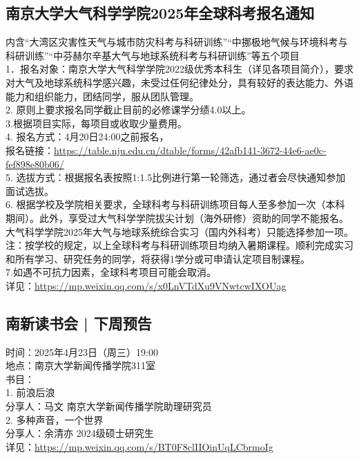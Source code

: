 \documentclass[letterpaper, 12pt]{article}
\begin{document}
\begin{multicols}{2}
\subsection{南京大学大气科学学院2025年全球科考报名通知} %
内含“大湾区灾害性天气与城市防灾科考与科研训练”“中挪极地气候与环境科考与科研训练”“中芬赫尔辛基大气与地球系统科考与科研训练”等五个项目
\\1．报名对象：南京大学大气科学学院2022级优秀本科生（详见各项目简介），要求对大气及地球系统科学感兴趣，未受过任何纪律处分，具有较好的表达能力、外语能力和组织能力，团结同学，服从团队管理。
\\2. 原则上要求报名同学截止目前的必修课学分绩4.0以上。
\\3.根据项目实际，每项目或收取少量费用。
\\4. 报名方式：4月20日24:00之前报名，
\\报名链接：\url{https://table.nju.edu.cn/dtable/forms/42afb141-3672-44e6-ae0c-fef898e80b06/}
\\5.  选拔方式：根据报名表按照1:1.5比例进行第一轮筛选，通过者会尽快通知参加面试选拔。
\\6. 根据学校及学院相关要求，全球科考与科研训练项目每人至多参加一次（本科期间）。此外，享受过大气科学学院拔尖计划（海外研修）资助的同学不能报名。大气科学学院2025年大气与地球系统综合实习（国内外科考）只能选择参加一项。
\\注：按学校的规定，以上全球科考与科研训练项目均纳入暑期课程。顺利完成实习和所有学习、研究任务的同学，将获得1学分或可申请认定项目制课程。
\\7.如遇不可抗力因素，全球科考项目可能会取消。
\\详见：\url{https://mp.weixin.qq.com/s/x0LnVTdXu9VNwtcwIXOUag}

\subsection{南新读书会 | 下周预告} %
时间：2025年4月23日（周三）19:00
\\地点：南京大学新闻传播学院311室
\\书目：
\\1. 前浪后浪
\\分享人：马文 南京大学新闻传播学院助理研究员
\\2. 多种声音，一个世界
\\分享人：余清亦 2024级硕士研究生
\\详见：\url{https://mp.weixin.qq.com/s/BT0F8clIIOinUqLCbrmoIg}

\end{multicols}
\end{document}
